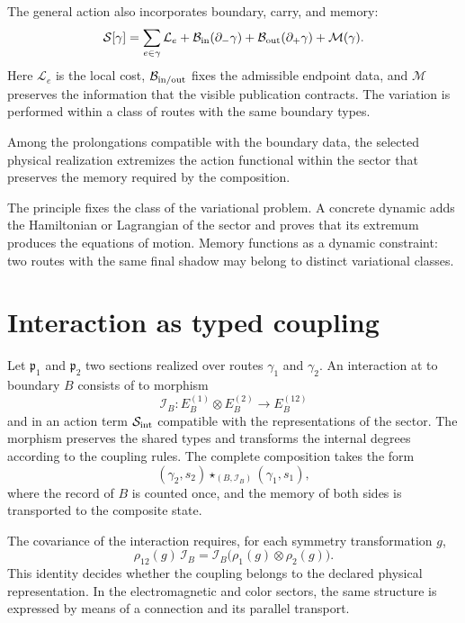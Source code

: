 The general action also incorporates boundary, carry, and memory:
\begin{equation}
 \mathcal S[\gamma]
 =\sum_{e\in\gamma}\mathcal L_e
 +\mathcal B_{\rm in}(\partial_-\gamma)
 +\mathcal B_{\rm out}(\partial_+\gamma)
 +\mathcal M(\gamma).
 \label{eq:mt-accion-ruta-general}
\end{equation}
Here $\mathcal L_e$ is the local cost, $\mathcal B_{\rm in/out}$ fixes the
admissible endpoint data, and $\mathcal M$ preserves the information that
the visible publication contracts. The variation is performed within a class
of routes with the same boundary types.

\begin{lecturafisica}[title={Principle of Minimal Interaction Compatible with Memory}]
\label{prin:mt-minima-interaccion}
Among the prolongations compatible with the boundary data, the
selected physical realization extremizes the action functional within the
sector that preserves the memory required by the composition.
\end{lecturafisica}

The principle fixes the class of the variational problem. A concrete dynamic
adds the Hamiltonian or Lagrangian of the sector and proves that its extremum
produces the equations of motion. Memory functions as a dynamic constraint:
two routes with the same final shadow may belong to distinct
variational classes.

\section{Interaction as typed coupling}

Let $\mathfrak p_1$ and $\mathfrak p_2$ two sections realized over routes
$\gamma_1$ and $\gamma_2$. An interaction at to boundary $B$ consists of
to morphism
\begin{equation}
 \mathcal I_B:
 E^{(1)}_B\otimes E^{(2)}_B
 \longrightarrow E^{(12)}_B
 \label{eq:mt-interaccion-frontera}
\end{equation}
and in an action term $\mathcal S_{\rm int}$ compatible with the
representations of the sector. The morphism preserves the shared types and
transforms the internal degrees according to the coupling rules. The
complete composition takes the form
\[
 (\gamma_2,s_2)\star_{(B,\mathcal I_B)}(\gamma_1,s_1),
\]
where the record of $B$ is counted once, and the memory of both sides is
transported to the composite state.

The covariance of the interaction requires, for each symmetry transformation
$g$,
\begin{equation}
 \rho_{12}(g)\,\mathcal I_B
 =\mathcal I_B\bigl(\rho_1(g)\otimes\rho_2(g)\bigr).
 \label{eq:mt-covariancia-interaccion}
\end{equation}
This identity decides whether the coupling belongs to the declared
physical representation. In the electromagnetic and color sectors, the same
structure is expressed by means of a connection and its parallel transport.

